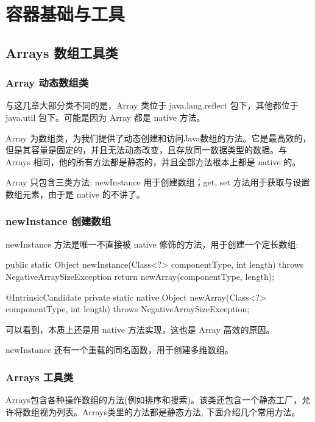 \section{容器基础与工具}

\subsection{Arrays 数组工具类}

\subsubsection{Array 动态数组类}

与这几章大部分类不同的是，Array 类位于 java.lang.reflect 包下，其他都位于 java.util 包下。可能是因为 Array 都是 native 方法。

Array 为数组类，为我们提供了动态创建和访问Java数组的方法。它是最高效的，但是其容量是固定的，并且无法动态改变，且存放同一数据类型的数据。与 Arrays 相同，他的所有方法都是静态的，并且全部方法根本上都是 native 的。

Array 只包含三类方法: newInstance 用于创建数组；get, set 方法用于获取与设置数组元素，由于是 native 的不讲了。

\subsubsection*{newInstance 创建数组}

newInstance 方法是唯一不直接被 native 修饰的方法，用于创建一个定长数组:

\begin{Java}
public static Object newInstance(Class<?> componentType, int length)
    throws NegativeArraySizeException {
    return newArray(componentType, length);
}

@IntrinsicCandidate
private static native Object newArray(Class<?> componentType, int length)
    throws NegativeArraySizeException;
\end{Java}

可以看到，本质上还是用 native 方法实现，这也是 Array 高效的原因。

newInstance 还有一个重载的同名函数，用于创建多维数组。

\subsubsection{Arrays 工具类}

Arrays包含各种操作数组的方法(例如排序和搜索)。该类还包含一个静态工厂，允许将数组视为列表。Arrays类里的方法都是静态方法, 下面介绍几个常用方法。


